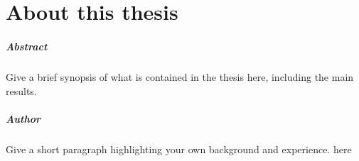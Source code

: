 
\chapter*{About this thesis}

\paragraph{Abstract}
Give a brief synopsis of what is contained in the thesis here, including the
main results.
\lipsum[1]



\paragraph{Author}
Give a short paragraph highlighting your own background and experience. here 
\lipsum[1]